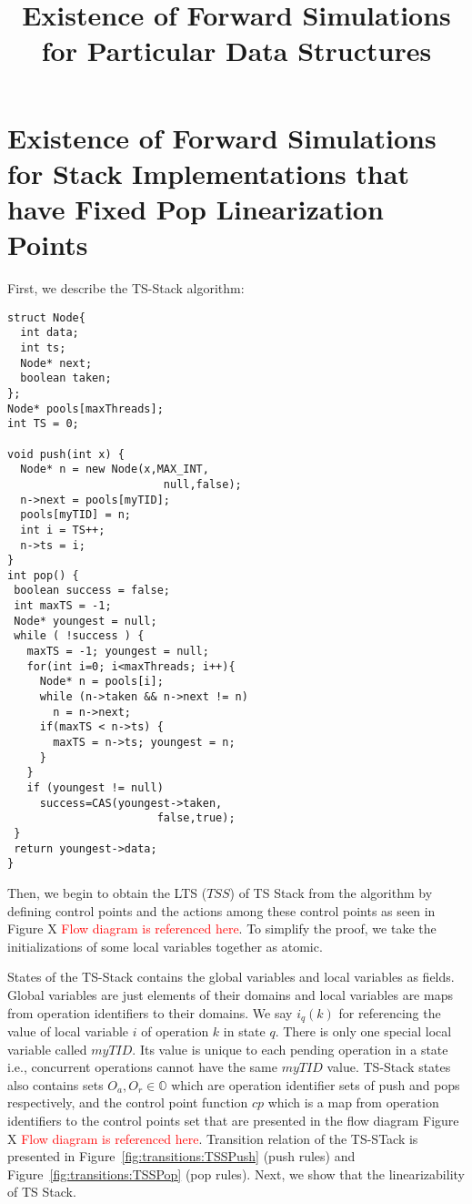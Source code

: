 \documentclass{article}
\title{Existence of Forward Simulations for Particular Data Structures}
\begin{document}
\maketitle



\section{Existence of Forward Simulations for Stack Implementations that have Fixed Pop Linearization Points}

First, we describe the TS-Stack algorithm:
\begin{lstlisting}
struct Node{
  int data;
  int ts;
  Node* next;
  boolean taken;
};
Node* pools[maxThreads];
int TS = 0;   

void push(int x) {
  Node* n = new Node(x,MAX_INT,
                        null,false);
  n->next = pools[myTID];
  pools[myTID] = n;
  int i = TS++;
  n->ts = i;
}
int pop() {
 boolean success = false;
 int maxTS = -1;
 Node* youngest = null;
 while ( !success ) {
   maxTS = -1; youngest = null;
   for(int i=0; i<maxThreads; i++){
     Node* n = pools[i];
     while (n->taken && n->next != n)
       n = n->next;
     if(maxTS < n->ts) {
       maxTS = n->ts; youngest = n;
     }
   }
   if (youngest != null)
     success=CAS(youngest->taken,
                       false,true);
 }
 return youngest->data;
}
\end{lstlisting}
Then, we begin to obtain the LTS ($TSS$) of TS Stack from the algorithm by defining control points and the actions among these control points as seen in Figure X \textcolor{red}{Flow diagram is referenced here}. To simplify the proof, we take the initializations of some local variables together as atomic.

States of the TS-Stack contains the global variables and local variables as fields. Global variables are just elements of their domains and local variables are maps from operation identifiers to their domains. We say $i_q(k)$ for referencing the value of local variable $i$ of operation $k$ in state $q$. There is only one special local variable called $myTID$. Its value is unique to each pending operation in a state i.e., concurrent operations cannot have the same $myTID$ value. TS-Stack states also contains sets $O_a, O_r \in \mathbb{O}$ which are operation identifier sets of push and pops respectively, and the control point function $cp$ which is a map from operation identifiers to the control points set that are presented in the flow diagram Figure X  \textcolor{red}{Flow diagram is referenced here}. Transition relation of the TS-STack is presented in Figure~\ref{fig:transitions:TSSPush} (push rules) and Figure~\ref{fig:transitions:TSSPop} (pop rules).
Next, we show that the linearizability of TS Stack.
\end{document}
